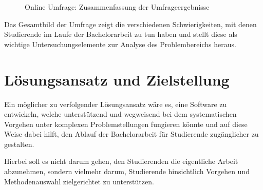 \documentclass[bibliography=totoc,listof=totoc,BCOR=5mm,DIV=12,oneside]{scrbook}
\begin{document}
\bigskip
\begin{figure}[H]

	
	\vspace{1.5cm}
	
	\vspace{1.5cm}
	
	\caption{Online Umfrage: Zusammenfassung der Umfrageergebnisse}
	\label{img:zusammenfassungOnlineUmfrage}
\end{figure}

\par \bigskip Das Gesamtbild der Umfrage zeigt die verschiedenen Schwierigkeiten, mit denen Studierende im Laufe der Bachelorarbeit zu tun haben und stellt diese als wichtige Untersuchungselemente zur Analyse des Problembereichs heraus.

\section{Lösungsansatz und Zielstellung}
\par Ein möglicher zu verfolgender Lösungsansatz wäre es, eine Software zu entwickeln, welche unterstützend und wegweisend bei dem systematischen Vorgehen unter komplexen Problemstellungen fungieren könnte und auf diese Weise dabei hilft, den Ablauf der Bachelorarbeit für Studierende zugänglicher zu gestalten.
\par Hierbei soll es nicht darum gehen, den Studierenden die eigentliche Arbeit abzunehmen, sondern vielmehr darum, Studierende hinsichtlich Vorgehen und Methodenauswahl zielgerichtet zu unterstützen.
\end{document}
